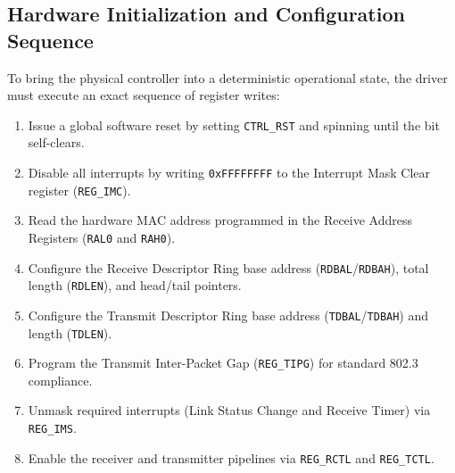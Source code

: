 \subsection{Hardware Initialization and Configuration Sequence}

To bring the physical controller into a deterministic operational state, the driver must execute an exact sequence of register writes:
\begin{enumerate}
    \item Issue a global software reset by setting \texttt{CTRL\_RST} and spinning until the bit self-clears.
    \item Disable all interrupts by writing \texttt{0xFFFFFFFF} to the Interrupt Mask Clear register (\texttt{REG\_IMC}).
    \item Read the hardware MAC address programmed in the Receive Address Registers (\texttt{RAL0} and \texttt{RAH0}).
    \item Configure the Receive Descriptor Ring base address (\texttt{RDBAL}/\texttt{RDBAH}), total length (\texttt{RDLEN}), and head/tail pointers.
    \item Configure the Transmit Descriptor Ring base address (\texttt{TDBAL}/\texttt{TDBAH}) and length (\texttt{TDLEN}).
    \item Program the Transmit Inter-Packet Gap (\texttt{REG\_TIPG}) for standard 802.3 compliance.
    \item Unmask required interrupts (Link Status Change and Receive Timer) via \texttt{REG\_IMS}.
    \item Enable the receiver and transmitter pipelines via \texttt{REG\_RCTL} and \texttt{REG\_TCTL}.
\end{enumerate}

